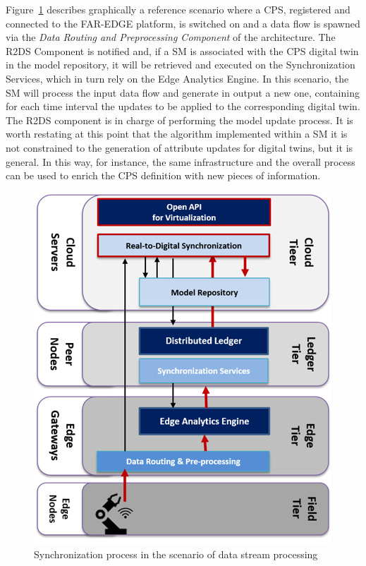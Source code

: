 Figure~\ref{fig:r2ds} describes graphically a reference scenario where a CPS, registered and connected to the FAR-EDGE platform, is switched on and a data flow is spawned via the \textit{Data Routing and Preprocessing Component} of the architecture. 
The R2DS Component is notified and, if a SM is associated with the CPS digital twin in the model repository, it will be retrieved and executed on the Synchronization Services, which in turn rely on the Edge Analytics Engine. 
In this scenario, the SM will process the input data flow and generate in output a new one, containing for each time interval the updates to be applied to the corresponding digital twin. 
The R2DS component is in charge of performing the model update process. 
It is worth restating at this point that the algorithm implemented within a SM it is not constrained to the generation of attribute updates for digital twins, but it is general. In this way, for instance, the same infrastructure and the overall process can be used to enrich the CPS definition with new pieces of information. 

\begin{figure}
	\centering
	\includegraphics[width=0.6\linewidth]{images/R2DS}
	\caption{Synchronization process in the scenario of data stream processing}
	\label{fig:r2ds}
\end{figure}


